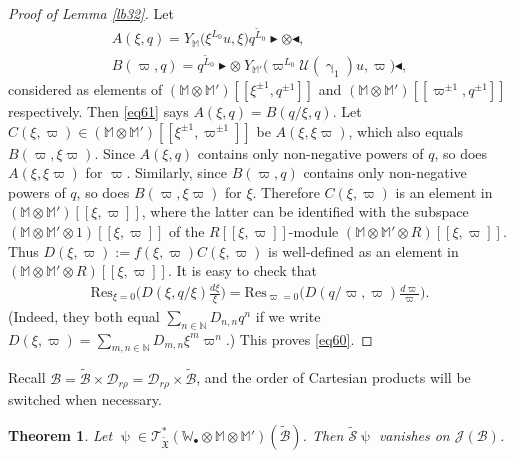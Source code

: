 \documentclass[12pt,a4paper,notitlepage]{article}
\theoremstyle{definition}
\theoremstyle{plain}
\newtheorem{thm}[df]{Theorem}
\newcommand{\fk}{\mathfrak}
\newcommand{\mc}{\mathcal}
\newcommand{\wtd}{\widetilde}
\newcommand{\Res}{\mathrm{Res}}
\newcommand{\scr}{\mathscr}
\newcommand{\blt}{\bullet}
\newcommand{\Wbb}{\mathbb W}
\newcommand{\Mbb}{\mathbb M}
\newcommand{\Nbb}{\mathbb N}
\newcommand{\btl}{\blacktriangleleft}
\newcommand{\btr}{\blacktriangleright}
\numberwithin{equation}{section}
\begin{document}
\begin{proof}[Proof of Lemma \ref{lb32}]
	Let 
	\begin{gather*}
	A(\xi,q)=Y_{\Mbb}\big(\xi^{L_0}u,\xi\big)q^{\wtd L_0}\btr\otimes\btl,\\
	B(\varpi,q)=q^{\wtd L_0}\btr\otimes~Y_{\Mbb'}\big(\varpi^{L_0}\mc U(\upgamma_1)u,\varpi\big)\btl,
	\end{gather*}
	considered as elements of $(\Mbb\otimes\Mbb')[[\xi^{\pm1},q^{\pm 1}]]$ and $(\Mbb\otimes\Mbb')[[\varpi^{\pm1},q^{\pm 1}]]$ respectively. Then \eqref{eq61} says $A(\xi,q)=B(q/\xi,q)$. Let $C(\xi,\varpi)\in(\Mbb\otimes\Mbb')[[\xi^{\pm 1},\varpi^{\pm1}]]$  be $A(\xi,\xi\varpi)$, which also equals $B(\varpi,\xi\varpi)$. Since $A(\xi,q)$ contains only non-negative  powers of $q$, so does $A(\xi,\xi\varpi)$ for $\varpi$.   Similarly, since $B(\varpi,q)$ contains only non-negative powers of $q$, so does $B(\varpi,\xi\varpi)$ for $\xi$. Therefore $C(\xi,\varpi)$ is an element in  $(\Mbb\otimes\Mbb')[[\xi,\varpi]]$, where the latter  can be identified with the subspace $(\Mbb\otimes\Mbb'\otimes 1)[[\xi,\varpi]]$ of the $R[[\xi,\varpi]]$-module $(\Mbb\otimes\Mbb'\otimes R)[[\xi,\varpi]]$. Thus $D(\xi,\varpi):=f(\xi,\varpi)C(\xi,\varpi)$ is well-defined as an element in $(\Mbb\otimes\Mbb'\otimes R)[[\xi,\varpi]]$. It is easy to check that
	\begin{align*}
	\Res_{\xi=0}\bigg(D(\xi,q/\xi)\frac{d\xi}{\xi}\bigg)=\Res_{\varpi=0}\bigg(D(q/\varpi,\varpi)\frac{d\varpi}{\varpi}\bigg).
	\end{align*}
	(Indeed, they both equal $\sum_{n\in\Nbb}D_{n,n}q^n$ if we write $D(\xi,\varpi)=\sum_{m,n\in\Nbb}D_{m,n}\xi^m\varpi^n$.) This proves \eqref{eq60}.
\end{proof}




Recall $\mc B=\wtd{\mc B}\times\mc D_{r\rho}=\mc D_{r\rho}\times\wtd{\mc B}$, and the order of Cartesian products will be switched when necessary.

\begin{thm}\label{lb34}
	Let $\uppsi\in\scr T_{\wtd{\fk X}}^*(\Wbb_\blt\otimes\Mbb\otimes\Mbb')(\wtd{\mc B})$. Then $\wtd{\mc S}\uppsi$ vanishes on $\scr J(\mc B)$.
\end{thm}
\end{document}

